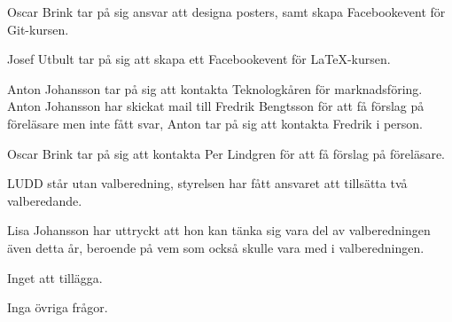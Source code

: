 \documentclass{protokoll}
\begin{document}
Oscar Brink tar på sig ansvar att designa posters, samt skapa Facebookevent för
Git-kursen. 


Josef Utbult tar på sig att skapa ett Facebookevent för LaTeX-kursen.


Anton Johansson tar på sig att kontakta Teknologkåren för marknadsföring.
Anton Johansson har skickat mail till Fredrik Bengtsson för att få förslag på
föreläsare men inte fått svar, Anton tar på sig att kontakta Fredrik i person.


Oscar Brink tar på sig att kontakta Per Lindgren för att få förslag på
föreläsare. 

LUDD står utan valberedning, styrelsen har fått ansvaret att tillsätta två
valberedande. 


Lisa Johansson har uttryckt att hon kan tänka sig vara del av valberedningen
även detta år, beroende på vem som också skulle vara med i valberedningen. 











Inget att tillägga.


Inga övriga frågor.
\end{document}
